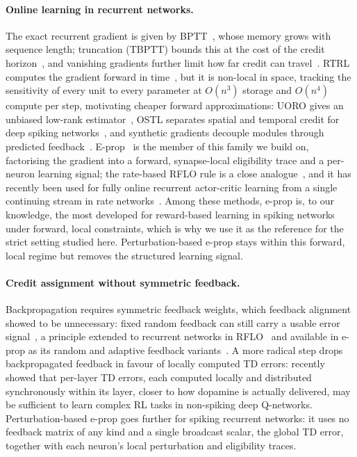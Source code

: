 \documentclass[10pt,twocolumn]{article}
\newcommand{\Method}{Perturbation-based e-prop}   %
\begin{document}
\paragraph{Online learning in recurrent networks.}
The exact recurrent gradient is given by BPTT~\citep{Werbos1990BackpropagationTT},
whose memory grows with sequence length; truncation (TBPTT) bounds this at the
cost of the credit horizon~\citep{WilliamsZipser1995}, and vanishing gradients
further limit how far credit can travel~\citep{learningLongTermHard}. RTRL
computes the gradient forward in time~\citep{RTRL}, but it is non-local in
space, tracking the sensitivity of every unit to every parameter at $O(n^3)$
storage and $O(n^4)$ compute per step,
motivating cheaper forward approximations: UORO gives an unbiased low-rank
estimator~\citep{UORO}, OSTL separates spatial and temporal credit for deep
spiking networks~\citep{OSTL}, and synthetic gradients decouple modules through
predicted feedback~\citep{Jaderberg2016}. E-prop~\citep{eprop2020} is the member
of this family we build on, factorising the gradient into a forward,
synapse-local eligibility trace and a per-neuron learning signal; the rate-based
RFLO rule is a close analogue~\citep{murray2019local}, and it has recently been
used for fully online recurrent actor-critic learning from a single continuing
stream in rate networks~\citep{Lemmel2025RTRRL}. Among these methods,
e-prop is, to our knowledge, the most developed for reward-based learning in
spiking networks under forward, local constraints, which is why we use it as
the reference for the strict setting studied here. \Method{} stays
within this forward, local regime but removes the structured learning signal.

\paragraph{Credit assignment without symmetric feedback.}
Backpropagation requires symmetric feedback weights, which feedback alignment
showed to be unnecessary: fixed random feedback can still carry a usable error
signal~\citep{Lillicrap2016}, a principle extended to recurrent networks in
RFLO~\citep{murray2019local} and available in e-prop as its random and adaptive
feedback variants~\citep{eprop2020}. A more radical step drops backpropagated
feedback in favour of locally computed TD errors: \citet{guan2024artificialdopamine}
recently showed that per-layer TD errors, each computed locally and
distributed synchronously within its layer, closer to how dopamine is actually
delivered, may be sufficient to learn complex RL tasks in non-spiking deep
Q-networks. \Method{} goes further for spiking recurrent networks: it
uses no feedback matrix of any kind and a single broadcast scalar, the global
TD error, together with each neuron's local perturbation and eligibility
traces.
\end{document}
